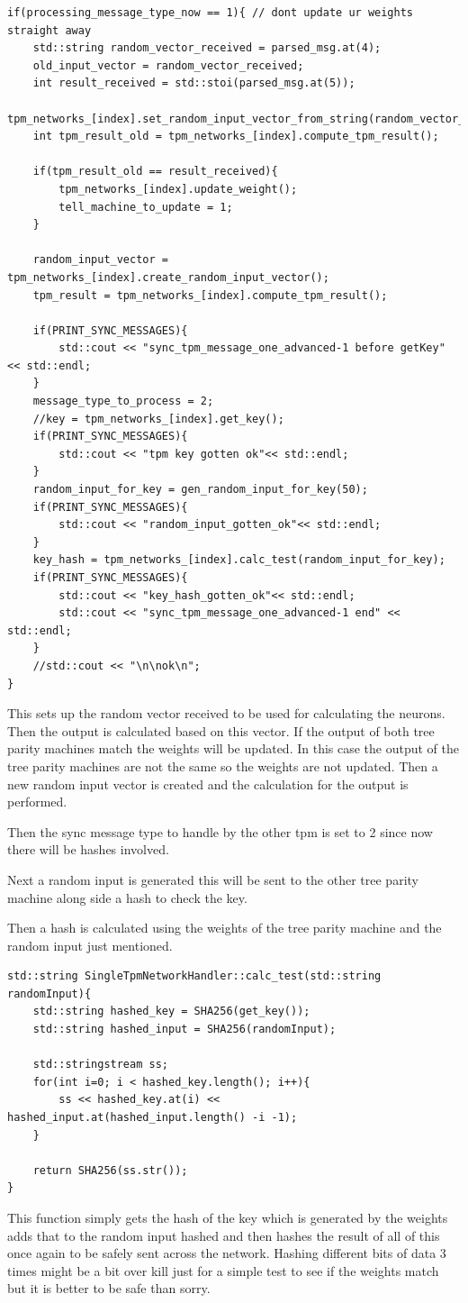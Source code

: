 \begin{lstlisting}
if(processing_message_type_now == 1){ // dont update ur weights straight away
	std::string random_vector_received = parsed_msg.at(4);
	old_input_vector = random_vector_received;
	int result_received = std::stoi(parsed_msg.at(5));
	tpm_networks_[index].set_random_input_vector_from_string(random_vector_received);
	int tpm_result_old = tpm_networks_[index].compute_tpm_result();
	
	if(tpm_result_old == result_received){
		tpm_networks_[index].update_weight();
		tell_machine_to_update = 1;
	}        
	
	random_input_vector = tpm_networks_[index].create_random_input_vector();
	tpm_result = tpm_networks_[index].compute_tpm_result();
	
	if(PRINT_SYNC_MESSAGES){
		std::cout << "sync_tpm_message_one_advanced-1 before getKey" << std::endl;
	}
	message_type_to_process = 2;
	//key = tpm_networks_[index].get_key();
	if(PRINT_SYNC_MESSAGES){
		std::cout << "tpm key gotten ok"<< std::endl;
	}
	random_input_for_key = gen_random_input_for_key(50);
	if(PRINT_SYNC_MESSAGES){
		std::cout << "random_input_gotten_ok"<< std::endl;
	}
	key_hash = tpm_networks_[index].calc_test(random_input_for_key);
	if(PRINT_SYNC_MESSAGES){
		std::cout << "key_hash_gotten_ok"<< std::endl;
		std::cout << "sync_tpm_message_one_advanced-1 end" << std::endl;
	}
	//std::cout << "\n\nok\n"; 
} 
\end{lstlisting}
This sets up the random vector received to be used for calculating the neurons. Then the output is calculated based on this vector. If the output of both tree parity machines match the weights will be updated. In this case the output of the tree parity machines are not the same so the weights are not updated.  
Then a new random input vector is created and the calculation for the output is performed. 

Then the  sync message type to handle by the other tpm is set to 2 since now there will be hashes involved.

Next a random input is generated this will be sent to the other tree parity machine along side a hash to check the key. 

Then a hash is calculated using the weights of the tree parity machine and the random input just mentioned.  
\begin{lstlisting}
std::string SingleTpmNetworkHandler::calc_test(std::string randomInput){
	std::string hashed_key = SHA256(get_key());
	std::string hashed_input = SHA256(randomInput);
	
	std::stringstream ss;
	for(int i=0; i < hashed_key.length(); i++){
		ss << hashed_key.at(i) << hashed_input.at(hashed_input.length() -i -1);
	}
	
	return SHA256(ss.str());
}
\end{lstlisting}
This function simply gets the hash of the key which is generated by the weights adds that to the random input hashed and then hashes the result of all of this once again to be safely sent across the network. Hashing different bits of data 3 times might be a bit over kill just for a simple test to see if the weights match but it is better to be safe than sorry.

